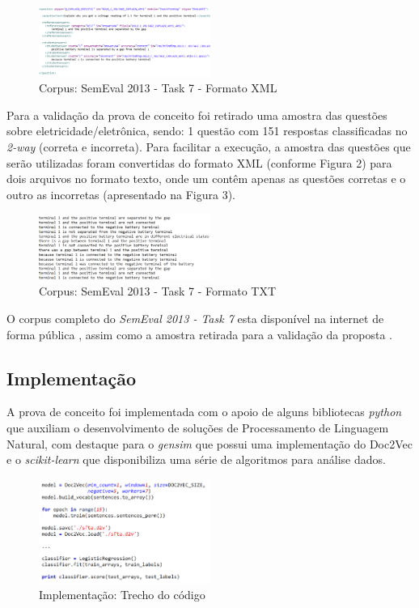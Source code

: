 \documentclass[conference]{IEEEtran}
\begin{document}
\begin{figure}[h]
\centering
\includegraphics[width=0.5\textwidth]{corpus}
\caption{Corpus: SemEval 2013 - Task 7 - Formato XML}
\end{figure}

Para a validação da prova de conceito foi retirado uma amostra das questões sobre eletricidade/eletrônica, sendo: 1 questão com 151 respostas classificadas no \textit{2-way} (correta e incorreta). Para facilitar a execução, a amostra das questões que serão utilizadas foram convertidas do formato XML (conforme Figura 2) para dois arquivos no formato texto, onde um contêm apenas as questões corretas e o outro as incorretas (apresentado na Figura 3).

\begin{figure}[h]
\centering
\includegraphics[width=0.5\textwidth]{corpus_txt}
\caption{Corpus: SemEval 2013 - Task 7 - Formato TXT}
\end{figure}

O corpus completo do \textit{SemEval 2013 - Task 7} esta disponível na internet de forma pública \cite{DzikovskaCorpus:2013}, assim como a amostra retirada para a validação da proposta \cite{Comelli:2016}.

\subsection{Implementação}
A prova de conceito foi implementada com o apoio de alguns bibliotecas \textit{python} que auxiliam o desenvolvimento de soluções de Processamento de Linguagem Natural, com destaque para o \textit{gensim} \cite{gensim:2016} que possui uma implementação do Doc2Vec e o \textit{scikit-learn} \cite{sklearn:2016} que disponibiliza uma série de algoritmos para análise dados.

\begin{figure}[h]
\centering
\includegraphics[width=0.5\textwidth]{code}
\caption{Implementação: Trecho do código}
\end{figure}
\end{document}
